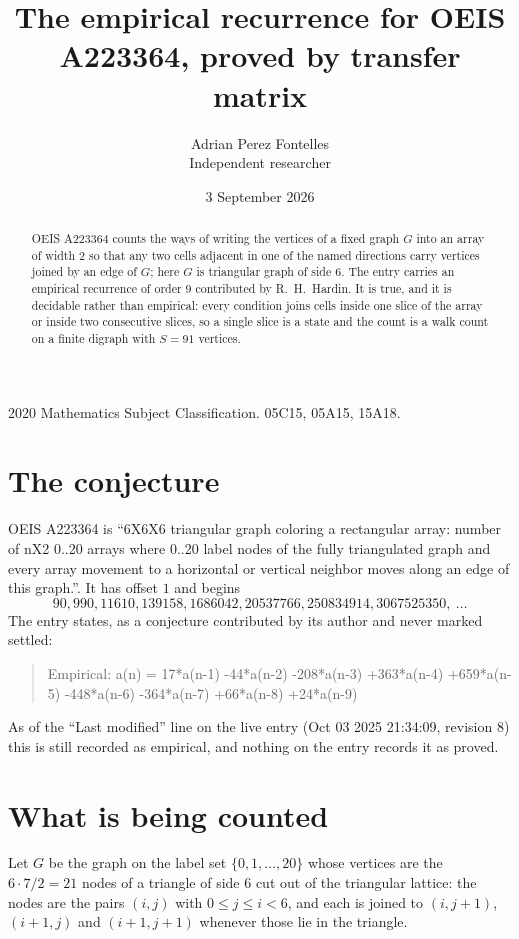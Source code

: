 \documentclass[11pt,a4paper]{article}
\title{The empirical recurrence for OEIS A223364, proved by transfer matrix}
\author{Adrian Perez Fontelles\\ \small Independent researcher}
\date{3 September 2026}
\theoremstyle{plain}
\theoremstyle{definition}
\begin{document}
\maketitle

\begin{abstract}
OEIS A223364 counts the ways of writing the vertices of a fixed graph $G$ into an array of width
$2$ so that any two cells adjacent in one of the named directions carry vertices joined by an
edge of $G$; here $G$ is triangular graph of side 6. The entry carries an empirical recurrence of order $9$
contributed by R.~H.~Hardin. It is true, and it is decidable rather than empirical: every
condition joins cells inside one slice of the array or inside two consecutive slices, so a
single slice is a state and the count is a walk count on a finite digraph with $S=91$ vertices.
\end{abstract}

\noindent\small 2020 Mathematics Subject Classification. 05C15, 05A15, 15A18.\normalsize

\section{The conjecture}

OEIS A223364 is ``6X6X6 triangular graph coloring a rectangular array: number of nX2 0..20 arrays where 0..20 label nodes of the fully triangulated graph and every array movement to a horizontal or vertical neighbor moves along an edge of this graph.''. It has offset $1$ and begins
\[
90, 990, 11610, 139158, 1686042, 20537766, 250834914, 3067525350,\ \dots
\]
The entry states, as a conjecture contributed by its author and never marked settled:
\begin{quote}
Empirical: a(n) = 17*a(n-1) -44*a(n-2) -208*a(n-3) +363*a(n-4) +659*a(n-5) -448*a(n-6) -364*a(n-7) +66*a(n-8) +24*a(n-9)
\end{quote}
As of the ``Last modified'' line on the live entry (Oct 03 2025 21:34:09, revision 8) this is still
recorded as empirical, and nothing on the entry records it as proved.

\section{What is being counted}

Let $G$ be the graph on the label set $\{0,1,\dots,20\}$ whose vertices are the $6\cdot7/2=21$ nodes of a triangle of side 6 cut out of the triangular lattice: the nodes are the pairs $(i,j)$ with $0\le j\le i<6$, and each is joined to $(i,j+1)$, $(i+1,j)$ and $(i+1,j+1)$ whenever those lie in the triangle.
\end{document}

